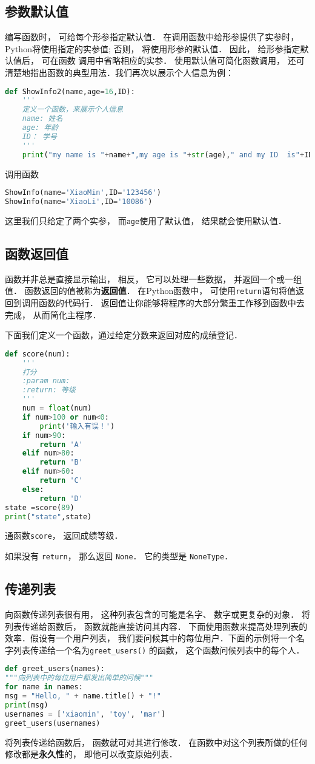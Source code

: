 \subsection{参数默认值}
编写函数时， 可给每个形参指定默认值． 在调用函数中给形参提供了实参时， Python将使用指定的实参值; 否则， 将使用形参的默认值． 因此， 给形参指定默认值后， 可在函数
调用中省略相应的实参． 使用默认值可简化函数调用， 还可清楚地指出函数的典型用法．我们再次以展示个人信息为例：
\begin{lstlisting}[language=python]
def ShowInfo2(name,age=16,ID):
    '''
    定义一个函数，来展示个人信息
    name: 姓名
    age: 年龄
    ID： 学号
    '''
    print("my name is "+name+",my age is "+str(age)," and my ID  is"+ID)
\end{lstlisting}
调用函数
\begin{lstlisting}[language=python]
ShowInfo(name='XiaoMin',ID='123456')
ShowInfo(name='XiaoLi',ID='10086')
\end{lstlisting}
这里我们只给定了两个实参， 而\verb|age|使用了默认值， 结果就会使用默认值．

\subsection{函数返回值}
函数并非总是直接显示输出， 相反， 它可以处理一些数据， 并返回一个或一组值． 函数返回的值被称为\textbf{返回值}． 在Python函数中， 可使用\verb|return|语句将值返回到调用函数的代码行． 返回值让你能够将程序的大部分繁重工作移到函数中去完成， 从而简化主程序．

下面我们定义一个函数，通过给定分数来返回对应的成绩登记．
\begin{lstlisting}[language=python]
def score(num):
    '''
    打分
    :param num:
    :return: 等级
    '''
    num = float(num)
    if num>100 or num<0:
        print('输入有误！')
    if num>90:
        return 'A'
    elif num>80:
        return 'B'
    elif num>60:
        return 'C'
    else:
        return 'D'
state =score(89)
print("state",state)
\end{lstlisting}
通函数\verb|score|， 返回成绩等级．

如果没有 \verb|return|， 那么返回 \verb|None|． 它的类型是 \verb|NoneType|．

\subsection{传递列表}
向函数传递列表很有用， 这种列表包含的可能是名字、 数字或更复杂的对象． 将列表传递给函数后， 函数就能直接访问其内容． 下面使用函数来提高处理列表的效率．假设有一个用户列表， 我们要问候其中的每位用户．下面的示例将一个名字列表传递给一个名为\verb|greet_users()| 的函数， 这个函数问候列表中的每个人．
\begin{lstlisting}[language=python]
def greet_users(names):
"""向列表中的每位用户都发出简单的问候"""
for name in names:
msg = "Hello, " + name.title() + "!"
print(msg)
usernames = ['xiaomin', 'toy', 'mar']
greet_users(usernames)
\end{lstlisting}
将列表传递给函数后， 函数就可对其进行修改． 在函数中对这个列表所做的任何修改都是\textbf{永久性}的， 即他可以改变原始列表．

